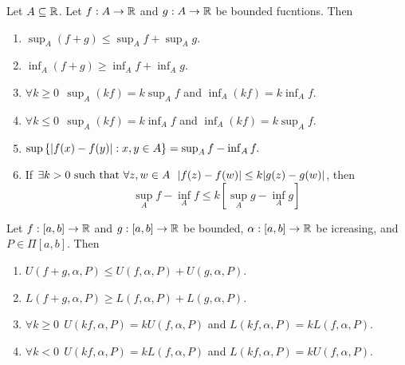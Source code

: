 \begin{lemma}
    Let $A \subseteq \mathbb{R}$. Let $f:A \to \mathbb{R}$ and $g: A \to \mathbb{R}$ be bounded fucntions. Then
    \begin{enumerate}
        \item $\sup_A(f+g) \leq \sup_A f + \sup_A g$.
        \item $\inf_A(f+g) \geq \inf_A f + \inf_A g$.
        \item $\forall k \geq 0 ~~ \sup_A(kf) = k \sup_A f$ and $\inf_A(kf) = k \inf_A f.$
        \item $\forall k \leq 0 ~~ \sup_A(kf) = k \inf_A f$ and $\inf_A (kf) = k \sup_A f.$
        \item $\sup\left\{|f(x) - f(y)| : x,y \in A\right\} = \sup_A f - \inf_A f.$
        \item If $\exists k > 0 \text{ such that } \forall z , w \in A ~~|f(z) - f(w)| \leq k |g(z) - g(w)|$, then $$\sup_A f - \inf_A f \leq k \left[\sup_A g - \inf_A g\right]$$
    \end{enumerate}
\end{lemma}

\begin{lemma}
    Let $f:[a,b] \to \mathbb{R}$ and $g : [a,b] \to \mathbb{R}$ be bounded, $\alpha: [a,b] \to \mathbb{R}$ be icreasing, and $P \in \Pi[a,b]$. Then
    \begin{enumerate}
        \item $U(f+g, \alpha, P) \leq U(f, \alpha, P) + U(g, \alpha, P)$.
        \item $L(f+g, \alpha, P) \geq L(f, \alpha, P) + L(g, \alpha, P)$.
        \item $\forall k \geq 0 ~~U(kf,\alpha, P) = kU(f, \alpha, P)$ and $L(kf, \alpha, P) = k L(f, \alpha, P)$.
        \item $\forall k < 0 ~~U(kf, \alpha, P) = kL(f, \alpha, P)$ and $L(kf, \alpha, P) = kU(f, \alpha, P)$.
    \end{enumerate}
\end{lemma}

